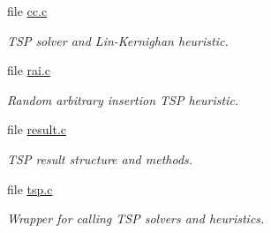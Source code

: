 \begin{CompactItemize}
\item 
file \hyperlink{cc_8c}{cc.c}
\begin{CompactList}\small\item\em TSP solver and Lin-Kernighan heuristic. \item\end{CompactList}

\item 
file \hyperlink{rai_8c}{rai.c}
\begin{CompactList}\small\item\em Random arbitrary insertion TSP heuristic. \item\end{CompactList}

\item 
file \hyperlink{tsp_2result_8c}{result.c}
\begin{CompactList}\small\item\em TSP result structure and methods. \item\end{CompactList}

\item 
file \hyperlink{lib_2tsp_2tsp_8c}{tsp.c}
\begin{CompactList}\small\item\em Wrapper for calling TSP solvers and heuristics. \item\end{CompactList}

\end{CompactItemize}
